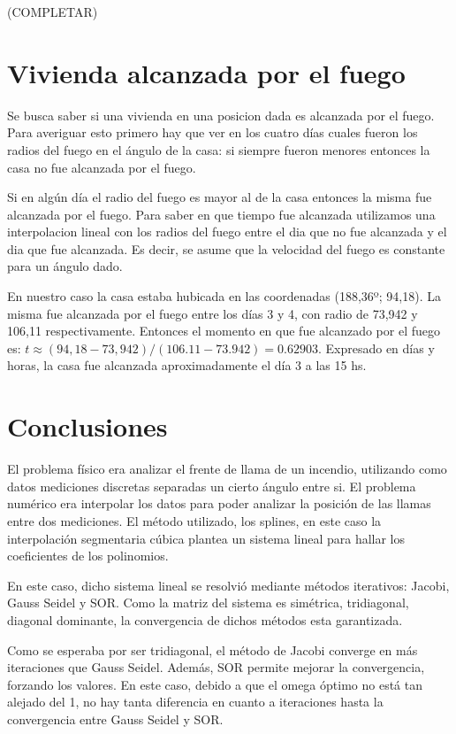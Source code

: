 \documentclass[12pt,spanish]{article}
\begin{document}
(COMPLETAR)

\section*{Vivienda alcanzada por el fuego}
Se busca saber si una vivienda en una posicion dada es alcanzada por el fuego.
Para averiguar esto primero hay que ver en los cuatro días cuales fueron los radios del fuego en el ángulo de la casa: si siempre fueron menores entonces la casa no fue alcanzada por el fuego.

Si en algún día el radio del fuego es mayor al de la casa entonces la misma fue alcanzada por el fuego. Para saber en que tiempo fue alcanzada utilizamos una interpolacion lineal con los radios del fuego entre el dia que no fue alcanzada y el dia que fue alcanzada. Es decir, se asume que la velocidad del fuego es constante para un ángulo dado.

En nuestro caso la casa estaba hubicada en las coordenadas (188,36º; 94,18). La misma fue alcanzada por el fuego entre los días 3 y 4, con radio de 73,942 y 106,11 respectivamente.
Entonces el momento en que fue alcanzado por el fuego es: $t \approx (94,18 - 73,942)/(106.11 - 73.942) = 0.62903$.
Expresado en días y horas, la casa fue alcanzada aproximadamente el día 3 a las 15 hs.

\section*{Conclusiones}
El problema físico era analizar el frente de llama de un incendio, utilizando como datos mediciones discretas separadas un cierto ángulo entre si. El problema numérico era interpolar los datos para poder analizar la posición de las llamas entre dos mediciones. El método utilizado, los splines, en este caso la interpolación segmentaria cúbica plantea un sistema lineal para hallar los coeficientes de los polinomios. 

En este caso, dicho sistema lineal se resolvió mediante métodos iterativos: Jacobi, Gauss Seidel y SOR. Como la matriz del sistema es simétrica, tridiagonal, diagonal dominante, la convergencia de dichos métodos esta garantizada.

Como se esperaba por ser tridiagonal, el método de Jacobi converge en más iteraciones que Gauss Seidel. Además, SOR permite mejorar la convergencia, forzando los valores. En este caso, debido a que el omega óptimo no está tan alejado del 1, no hay tanta diferencia en cuanto a iteraciones hasta la convergencia entre Gauss Seidel y SOR. 
\end{document}
